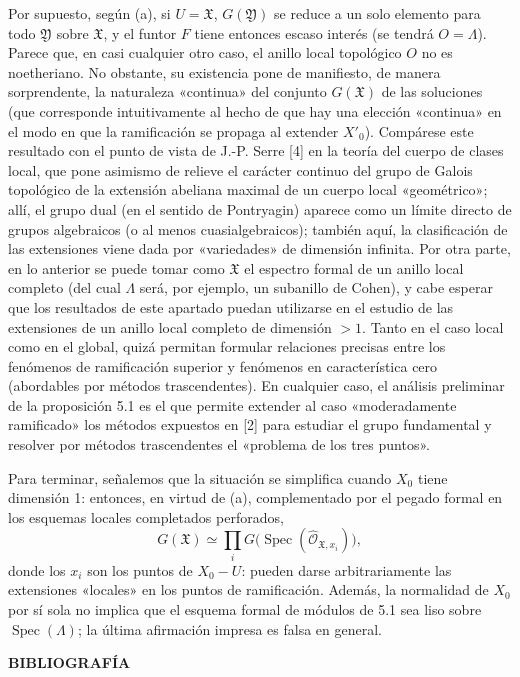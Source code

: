 Por supuesto, según (a), si $U=\mathfrak X$, $G(\mathfrak Y)$ se reduce a un
solo elemento para todo $\mathfrak Y$ sobre $\mathfrak X$, y el funtor $F$
tiene entonces escaso interés (se tendrá $O=\Lambda$). Parece que, en casi
cualquier otro caso, el anillo local topológico $O$ no es noetheriano. No
obstante, su existencia pone de manifiesto, de manera sorprendente, la
naturaleza «continua» del conjunto $G(\mathfrak X)$ de las soluciones (que
corresponde intuitivamente al hecho de que hay una elección «continua» en el
modo en que la ramificación se propaga al extender $X'_0$). Compárese este
resultado con el punto de vista de J.-P. Serre [4] en la teoría del cuerpo de
clases local, que pone asimismo de relieve el carácter continuo del grupo de
Galois topológico de la extensión abeliana maximal de un cuerpo local
«geométrico»; allí, el grupo dual (en el sentido de Pontryagin) aparece como un
límite directo de grupos algebraicos (o al menos cuasialgebraicos); también
aquí, la clasificación de las extensiones viene dada por «variedades» de
dimensión infinita. Por otra parte, en lo anterior se puede tomar como
$\mathfrak X$ el espectro formal de un anillo local completo (del cual
$\Lambda$ será, por ejemplo, un subanillo de Cohen), y cabe esperar que los
resultados de este apartado puedan utilizarse en el estudio de las extensiones
de un anillo local completo de dimensión $>1$. Tanto en el caso local como en
el global, quizá permitan formular relaciones precisas entre los fenómenos de
ramificación superior y fenómenos en característica cero (abordables por
métodos trascendentes). En cualquier caso, el análisis preliminar de la
proposición 5.1 es el que permite extender al caso «moderadamente ramificado»
los métodos expuestos en [2] para estudiar el grupo fundamental y resolver por
métodos trascendentes el «problema de los tres puntos».

Para terminar, señalemos que la situación se simplifica cuando $X_0$ tiene dimensión 1: entonces, en virtud de (a), complementado por el pegado formal en los esquemas locales completados perforados,
\[
  G(\mathfrak X)\simeq
  \prod_iG\bigl(\operatorname{Spec}(\widehat{\mathcal O}_{\mathfrak X,x_i})\bigr),
\]
donde los $x_i$ son los puntos de $X_0-U$: pueden darse arbitrariamente las
extensiones «locales» en los puntos de ramificación. Además, la normalidad de $X_0$ por sí sola no implica que el esquema formal de módulos de 5.1 sea liso sobre $\operatorname{Spec}(\Lambda)$; la última afirmación impresa es falsa en general.

\begin{center}
  \textbf{BIBLIOGRAFÍA}
\end{center}


